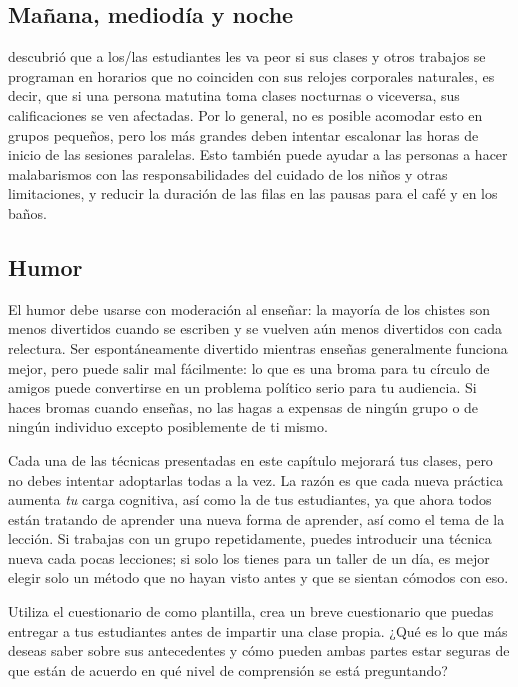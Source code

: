 \subsection*{Mañana, mediodía y noche}

\cite{Smar2018} descubrió que
a los/las estudiantes les va peor
si sus clases y otros trabajos se programan en horarios que no coinciden con sus relojes corporales naturales,
es decir, que si una persona matutina toma clases nocturnas o viceversa,
sus calificaciones se ven afectadas.
Por lo general, no es posible acomodar esto en grupos pequeños,
pero los más grandes deben intentar escalonar las horas de inicio de las sesiones paralelas.
Esto también puede ayudar a las personas a hacer malabarismos con las responsabilidades del cuidado de los niños y otras limitaciones,
y reducir la duración de las filas en las pausas para el café y en los baños.

\subsection*{Humor}

El humor debe usarse con moderación al enseñar:
la mayoría de los chistes son menos divertidos cuando se escriben
y se vuelven aún menos divertidos con cada relectura.
Ser espontáneamente divertido mientras enseñas generalmente funciona mejor,
pero puede salir mal fácilmente:
lo que es una broma para tu círculo de amigos
puede convertirse en un problema político serio para tu audiencia.
Si haces bromas cuando enseñas,
no las hagas a expensas de ningún grupo
o de ningún individuo excepto posiblemente de ti mismo.


Cada una de las técnicas presentadas en este capítulo mejorará tus clases,
pero no debes intentar adoptarlas todas a la vez.
La razón es que cada nueva práctica aumenta \emph{tu} carga cognitiva, así como la de tus estudiantes,
ya que ahora todos están tratando de aprender una nueva forma de aprender,
así como el tema de la lección.
Si trabajas con un grupo repetidamente,
puedes introducir una técnica nueva cada pocas lecciones;
si solo los tienes para un taller de un día,
es mejor elegir solo un método que no hayan visto antes
y que se sientan cómodos con eso.



Utiliza el cuestionario de  como plantilla,
crea un breve cuestionario que puedas entregar a tus estudiantes antes de impartir una clase propia.
¿Qué es lo que más deseas saber sobre sus antecedentes
y cómo pueden ambas partes estar seguras de que están de acuerdo en qué nivel de comprensión se está preguntando?

